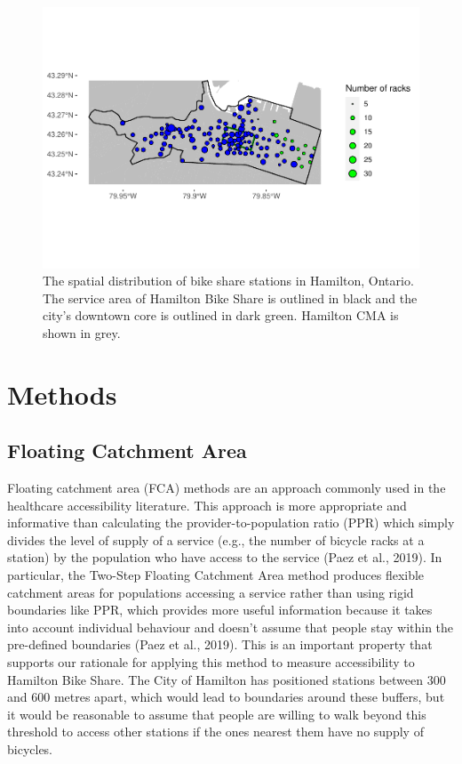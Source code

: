 \documentclass[]{elsarticle} %
\begin{document}
\begin{figure}

{\centering \includegraphics[width=1\linewidth]{Bike-share-spatial-equity_files/figure-latex/sobi-stations-in-hamilton-1} 

}

\caption{The spatial distribution of bike share stations in Hamilton, Ontario. The service area of Hamilton Bike Share is outlined in black and the city's downtown core is outlined in dark green. Hamilton CMA is shown in grey.}\label{fig:sobi-stations-in-hamilton}
\end{figure}

\hypertarget{sec:methods}{%
\section{Methods}\label{sec:methods}}

\hypertarget{floating-catchment-area}{%
\subsection{Floating Catchment Area}\label{floating-catchment-area}}

Floating catchment area (FCA) methods are an approach commonly used in
the healthcare accessibility literature. This approach is more
appropriate and informative than calculating the provider-to-population
ratio (PPR) which simply divides the level of supply of a service (e.g.,
the number of bicycle racks at a station) by the population who have
access to the service (Paez et al., 2019). In particular, the Two-Step
Floating Catchment Area method produces flexible catchment areas for
populations accessing a service rather than using rigid boundaries like
PPR, which provides more useful information because it takes into
account individual behaviour and doesn't assume that people stay within
the pre-defined boundaries (Paez et al., 2019). This is an important
property that supports our rationale for applying this method to measure
accessibility to Hamilton Bike Share. The City of Hamilton has
positioned stations between 300 and 600 metres apart, which would lead
to boundaries around these buffers, but it would be reasonable to assume
that people are willing to walk beyond this threshold to access other
stations if the ones nearest them have no supply of bicycles.
\end{document}
